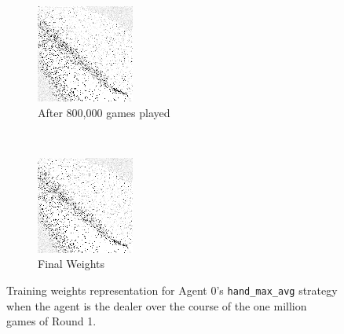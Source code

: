 \begin{figure}
	\begin{subfigure}[b]{0.4\textwidth}
	\includegraphics[width=\linewidth]{images/findings/round1/flipbook_e.png}
	\caption{After 800,000 games played}
	\end{subfigure}
	~
	\begin{subfigure}[b]{0.4\textwidth}
	\includegraphics[width=\linewidth]{images/findings/round1/flipbook_f.png}
	\caption{Final Weights}
	\end{subfigure}

\caption{%
	Training weights representation for Agent 0's \texttt{hand\_max\_avg}
	strategy when the agent is the dealer
	over the course of the one million games of Round 1.%
}
\label{fig:r1-flip}
\end{figure}
